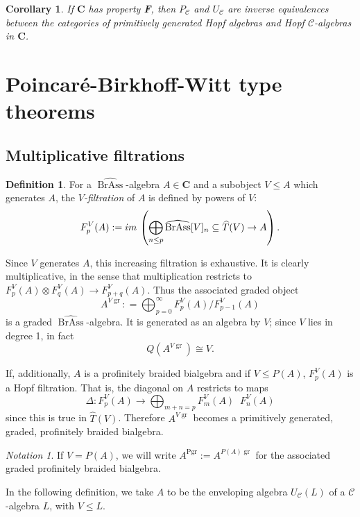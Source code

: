 \documentclass[12pt]{article}
\DeclareMathOperator{\BrAss}{BrAss}
\DeclareMathOperator{\Pgr}{Pgr}
\DeclareMathOperator{\gr}{gr}
\DeclareMathOperator{\hattimes}{\widehat{\otimes}}
\newcommand{\BrAsshat}{\widehat{\BrAss}} %
\newcommand{\That}{\widehat{T}}
\newcommand{\CC} {\mathcal{C}}
\newcommand{\bC} {\mathbf{C}}
\newcommand{\im}{{\rm im \,}}
\newcommand{\beqn}{\begin{equation}}
\newcommand{\eeqn}{\end{equation}}
\theoremstyle{plain}
\newtheorem{cor}[thm]{Corollary}
\theoremstyle{definition}
\newtheorem{defn}[thm]{Definition}
\theoremstyle{remark}
\newtheorem{notation}[thm]{Notation}
\begin{document}
\begin{cor} \label{mm_finite_cor} If $\bC$ has property {\bf F}, then $P_{\CC}$ and $U_{\CC}$ are inverse equivalences between the categories of primitively generated Hopf algebras and Hopf $\CC$-algebras in $\bC$.  \end{cor}

\section{Poincar\'{e}-Birkhoff-Witt type theorems} \label{pbw_section}

\subsection{Multiplicative filtrations} \label{filt_sec}

\begin{defn}

For a $\BrAsshat$-algebra $A \in \bC$ and a subobject $V \leq A$ which generates $A$, the \emph{$V$-filtration} of $A$ is defined by powers of $V$:
%
$$F_p^V(A):= \im\left(\bigoplus_{n \leq p} \BrAsshat[V]_n \subseteq \That(V) \to A \right).$$

\end{defn}

Since $V$ generates $A$, this increasing filtration is exhaustive.  It is clearly multiplicative, in the sense that multiplication restricts to $F_p^V(A) \otimes F_q^V(A) \to F_{p+q}^V(A)$.  Thus the associated graded object 
%
$$A^{V\gr}: = \bigoplus_{p=0}^{\infty} F_p^V(A)/F_{p-1}^V(A)$$
%
is a graded $\BrAsshat$-algebra.  It is generated as an algebra by $V$; since $V$ lies in degree 1, in fact 
%
\beqn \label{indecomp_graded_eqn} Q(A^{V\gr}) \cong V. \eeqn

If, additionally, $A$ is a profinitely braided bialgebra and if $V \leq P(A)$, $F_p^V(A)$ is a Hopf filtration.  That is, the diagonal on $A$ restricts to maps 
%
$$\Delta: F_p^V(A) \to \bigoplus_{m+n=p} F_m^V(A) \hattimes F_n^V(A)$$
%
since this is true in $\That(V)$.  Therefore $A^{V\gr}$ becomes a primitively generated, graded, profinitely braided bialgebra.

\begin{notation}  If $V = P(A)$, we will write $A^{\Pgr}:= A^{P(A) \gr}$ for the associated graded profinitely braided bialgebra. \end{notation}

In the following definition, we take $A$ to be the enveloping algebra $U_{\CC}(L)$ of a $\CC$-algebra $L$, with $V \leq L$.
\end{document}
